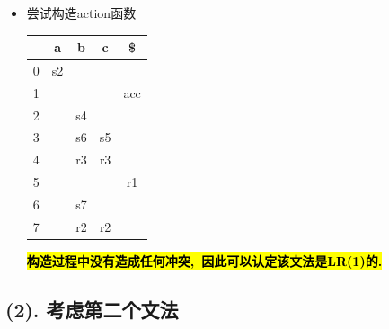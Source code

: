 \documentclass[UTF8]{article}
\newcommand{\blt}{\bullet}
\newcommand{\hlg}[1]{
	\begingroup
		\sethlcolor{lgray}%
		\textcolor{black}{\hl{\mbox{#1}}}%
	\endgroup
}
\begin{document}
\begin{itemize}
\begin{itemize}
\begin{itemize}
$$\begin{array}{ll}
			A\rightarrow b\blt & , b/c\\
			\end{array}\right.$$
		\end{itemize}
	\item 从$I_3$出发
		\begin{itemize}
		\item 考虑$goto(I_3,c)$
			$$I_5\left\{\begin{array}{ll}
			S\rightarrow aAc\blt & ,\$ \\
			\end{array}\right.$$
		\item 考虑$goto(I_3,b)$
			$$I_6\left\{\begin{array}{ll}
			A\rightarrow Ab\blt b & , b/c\\
			\end{array}\right.$$
		\end{itemize}
	\item 从$I_4,I_5$均无
	\item 从$I_6$, 考虑$goto(I_6,b)$
		$$I_7\left\{\begin{array}{ll}
		A\rightarrow Abb\blt & , b/c\\
		\end{array}\right.$$
	\end{itemize}
\item 尝试构造action函数
	\begin{center}
	\begin{tabular}{|c|c|c|c|c|}
	\hline
	 & a & b & c & \$ \\
	\hline
	0 & s2 &  &  &  \\
	\hline
	1 &  &  &  & acc \\
	\hline
	2 &  & s4 &  &  \\
	\hline
	3 &  & s6 & s5 &  \\
	\hline
	4 &  & r3 & r3 &  \\
	\hline
	5 &  &  &  & r1 \\
	\hline
	6 &  & s7 &  &  \\
	\hline
	7 &  & r2 & r2 &  \\
	\hline
	\end{tabular}
	\end{center}
	\hlg{\textbf{构造过程中没有造成任何冲突, 因此可以认定该文法是LR(1)的.}}
\end{itemize}

\subsection*{(2). 考虑第二个文法}
\end{document}
